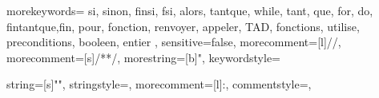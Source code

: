 {
morekeywords={
si, sinon, finsi, fsi, alors,
tantque, while, tant, que,
for, do, fintantque,fin, pour,
fonction, renvoyer, appeler,
TAD, fonctions, utilise, preconditions, 
booleen, entier
},
sensitive=false, %
morecomment=[l]{//}, %
morecomment=[s]{/*}{*/}, %
morestring=[b]", %
keywordstyle=\bfseries\color{darkgray}
}

{
	string=[s]{"}{"},
    stringstyle=\color{underbelux},
	morecomment=[l]{:},
	commentstyle=\color{black},
}


\newcommand{\displaycode}[2][]{\begin{center}\lstinline[mathescape,#1]^#2^ \end{center}}
	



\def\cad{c'est-à-dire}
\def\ie{\emph{i.e.}}
\def\guy#1{\textcolor{blue}{\bfseries #1}}









